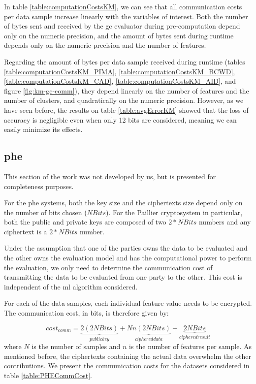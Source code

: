 In table \ref{table:computationCostsKM}, we can see that all communication costs per data sample increase linearly with the variables of interest. Both the number of bytes sent and received by the \ac{gc} evaluator during pre-computation depend only on the numeric precision, and the amount of bytes sent during runtime depends only on the numeric precision and the number of features.

Regarding the amount of bytes per data sample received during runtime (tables \ref{table:computationCostsKM_PIMA}, \ref{table:computationCostsKM_BCWD}, \ref{table:computationCostsKM_CAD}, \ref{table:computationCostsKM_AID}, and figure \ref{fig:km-gc-comm}), they depend linearly on the number of features and the number of clusters, and quadratically on the numeric precision. However, as we have seen before, the results on table \ref{table:avgErrorKM} showed that the loss of accuracy is negligible even when only 12 bits are considered, meaning we can easily minimize its effects.


\subsection{\acl{phe}}

This section of the work was not developed by us, but is presented for completeness purposes.

For the \ac{phe} systems, both the key size and the ciphertexts size depend only on the number of bits chosen ($NBits$). For the Paillier cryptosystem in particular, both the public and private keys are composed of two $2*NBits$ numbers and any ciphertext is a $2*NBits$ number.

Under the assumption that one of the parties owns the data to be evaluated and the other owns the evaluation model and has the computational power to perform the evaluation, we only need to determine the communication cost of transmitting the data to be evaluated from one party to the other. This cost is independent of the \ac{ml} algorithm considered.

For each of the data samples, each individual feature value needs to be encrypted. The communication cost, in bits, is therefore given by:

\begin{equation}
\label{eq:PHE_commCost}
cost_{comm} = \underbrace{2(2NBits)}_{public key} + \underbrace{Nn(2NBits)}_{ciphered data} + \underbrace{2NBits}_{ciphered result} 
\end{equation}
where $N$ is the number of samples and $n$ is the number of features per sample. As mentioned before, the ciphertexts containing the actual data overwhelm the other contributions. We present the communication costs for the datasets considered in table \ref{table:PHECommCost}.

